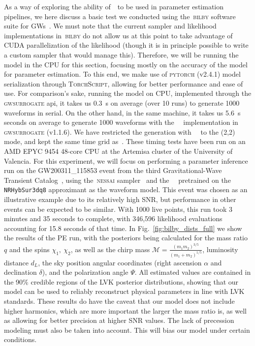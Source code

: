 \documentclass[%
 reprint,
superscriptaddress,
nofootinbib,
 amsmath,amssymb,
 aps,
prd,
floatfix,
]{revtex4-2}
\newcommand{\change}[1]{#1}
\begin{document}
As a way of exploring the ability of~\dansur~to be used in parameter estimation pipelines, we here discuss a basic test we conducted using the~\textsc{bilby} software suite for GWs~\cite{bilby_paper}. We must note that the current sampler and likelihood implementations in~\textsc{bilby} do not allow us at this point to take advantage of CUDA parallelization of the likelihood (though it is in principle possible to write a custom sampler that would manage this). Therefore, we will be running the model in the CPU for this section, focusing mostly on the accuracy of the model for parameter estimation.  To this end, we make use of \textsc{pytorch} (v2.4.1) model serialization through \textsc{TorchScript}, allowing for better performance and ease of use. For comparison's sake,  running the model on CPU,  implemented through the \textsc{gwsurrogate} api,  it takes us 0.3~s on average (over 10 runs) to generate 1000 waveforms in serial. On the other hand, in the same machine, it takes us 5.6~s seconds on average to generate 1000 waveforms with the ~\targsur~implementation in \textsc{gwsurrogate} (v1.1.6). We have restricted the generation with~\targsur~ to the (2,2) mode, and kept the same time grid as~\dansur. \change{These timing tests have been run on an AMD EPYC 9454 48-core CPU at the Artemisa cluster of the University of Valencia.}
For this experiment, we will focus on performing a parameter inference run on the GW200311\_115853 event from the third Gravitational-Wave Transient Catalog~\cite{GWTC-3}, using the~\textsc{nessai} sampler~\cite{nessai} and the~\dansur~ pretrained on the \texttt{NRHybSur3dq8} approximant as the waveform model. This event was chosen as an illustrative example due to its relatively high SNR, but performance in other events can be expected to be similar. With 1000 live points, this run took 3 minutes and 35 seconds to complete, with 346,596 likelihood evaluations accounting for 15.8 seconds of that time. In Fig.~\ref{fig:bilby_dists_full} we show the results of the PE run, with the posteriors being calculated for the mass ratio $q$ and the spins $\chi_1,~\chi_2$, as well as the chirp mass $\mathcal{M} = \frac{(m_1 m_2)^{3/5}}{(m_1 + m_2)^{1/5}}$, luminosity distance $d_L$, the sky position angular coordinates (right ascension $\alpha$ and declination $\delta$), and the polarization angle $\Psi$. All estimated values are contained in the 90\% credible regions of the LVK posterior distributions, showing that our model can be used to reliably reconstruct physical parameters in line with LVK standards. These results do have the caveat that our model does not include higher harmonics, which are more important the larger the mass ratio is, as well as allowing for better precision at higher SNR values. The lack of precession modeling must also be taken into account. This will bias our model under certain conditions.
\end{document}
